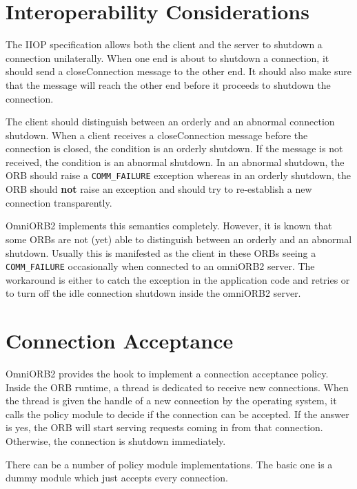 \documentclass[11pt,twoside,onecolumn]{book}
\begin{document}
\section{Interoperability Considerations}

The IIOP specification allows both the client and the server to shutdown a
connection unilaterally. When one end is about to shutdown a connection,
it should send a closeConnection message to the other end. It should also make
sure that the message will reach the other end before it proceeds to
shutdown the connection. 

The client should distinguish between an orderly and an abnormal connection
shutdown. When a client receives a closeConnection message before the
connection is closed, the condition is an orderly shutdown. If the message
is not received, the condition is an abnormal shutdown. In an abnormal
shutdown, the ORB should raise a {\tt COMM\_FAILURE} exception whereas in
an orderly shutdown, the ORB should {\bf not} raise an exception and should
try to re-establish a new connection transparently.

OmniORB2 implements this semantics completely. However, it is known that
some ORBs are not (yet) able to distinguish between an orderly and an
abnormal shutdown. Usually this is manifested as the client in these ORBs
seeing a {\tt COMM\_FAILURE} occasionally when connected to an omniORB2
server. The workaround is either to catch the exception in the application
code and retries or to turn off the idle connection shutdown inside the
omniORB2 server.


\section{Connection Acceptance}
\label{sec_accept}

OmniORB2 provides the hook to implement a connection acceptance
policy. Inside the ORB runtime, a thread is dedicated to receive new
connections. When the thread is given the handle of a new connection by
the operating system, it calls the policy module to decide if the
connection can be accepted. If the answer is yes, the ORB will start
serving requests coming in from that connection. Otherwise, the connection
is shutdown immediately.

There can be a number of policy module implementations. The basic one is a
dummy module which just accepts every connection. 
\end{document}

